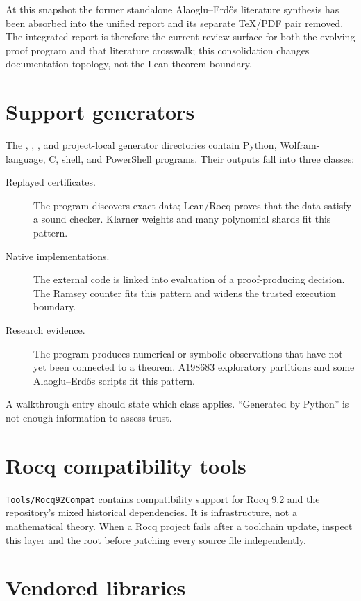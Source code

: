\documentclass[
  10pt,
  a4paper,
  twoside,
  open=any,
  parskip=half,
  headings=big
]{scrreprt}
\newcommand{\CommitFull}{56a402bf82a9aab119fcbe3e96b991d387b221c5}
\newcommand{\RepoWeb}{https://github.com/VladimirReshetnikov/ProveIt}
\newcommand{\RepoTreeBase}{\RepoWeb/tree/\CommitFull}
\newcommand{\code}[1]{\texttt{\detokenize{#1}}}
\newcommand{\RepoDir}[1]{\href{\RepoTreeBase/#1}{\nolinkurl{#1}}}
\begin{document}
At this snapshot the former standalone Alaoglu--Erd\H{o}s literature synthesis has been absorbed into the unified report and its separate TeX/PDF pair removed. The integrated report is therefore the current review surface for both the evolving proof program and that literature crosswalk; this consolidation changes documentation topology, not the Lean theorem boundary.

\section{Support generators}

The \code{Support}, \code{Tools}, \code{scripts}, and project-local generator directories contain Python, Wolfram-language, C, shell, and PowerShell programs. Their outputs fall into three classes:

\begin{description}
  \item[Replayed certificates.] The program discovers exact data; Lean/Rocq proves that the data satisfy a sound checker. Klarner weights and many polynomial shards fit this pattern.
  \item[Native implementations.] The external code is linked into evaluation of a proof-producing decision. The Ramsey counter fits this pattern and widens the trusted execution boundary.
  \item[Research evidence.] The program produces numerical or symbolic observations that have not yet been connected to a theorem. A198683 exploratory partitions and some Alaoglu--Erd\H{o}s scripts fit this pattern.
\end{description}

A walkthrough entry should state which class applies. ``Generated by Python'' is not enough information to assess trust.

\section{Rocq compatibility tools}

\RepoDir{Tools/Rocq92Compat} contains compatibility support for Rocq 9.2 and the repository's mixed historical dependencies. It is infrastructure, not a mathematical theory. When a Rocq project fails after a toolchain update, inspect this layer and the root \code{_CoqProject} before patching every source file independently.

\section{Vendored libraries}
\end{document}
